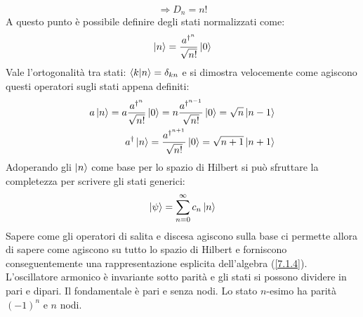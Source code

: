 \documentclass[twoside]{article}
\begin{document}
\begin{equation*}
    \Rightarrow D_n = n!
\end{equation*}
A questo punto è possibile definire degli stati normalizzati come:
\begin{equation}
    \ket{n}=\frac{a^{\dagger^n}}{\sqrt{n!}}\ket{0}
\end{equation}
Vale l'ortogonalità tra stati: $\bra{k}\ket{n}=\delta_{kn}$ e si dimostra velocemente come agiscono questi operatori sugli stati appena definiti:
\begin{equation} 
\begin{split}
    a\ket{n}=a\frac{a^{\dagger^n}}{\sqrt{n!}}\ket{0}=n\frac{a^{\dagger^{n-1}}}{\sqrt{n!}}\ket{0}=\sqrt{n}\ket{n-1} \\
    a^{\dagger}\ket{n}=\frac{a^{\dagger^{n+1}}}{\sqrt{n!}}\ket{0}=\sqrt{n+1}\ket{n+1}
\end{split}
\end{equation}
Adoperando gli $\ket{n}$ come base per lo spazio di Hilbert si può sfruttare la completezza per scrivere gli stati generici:
\begin{equation}
   \ket{\psi}=\displaystyle\sum_{n=0}^{\infty} c_n \ket{n} 
\end{equation}
Sapere come gli operatori di salita e discesa agiscono sulla base ci permette allora di sapere come agiscono su tutto lo spazio di Hilbert e forniscono conseguentemente una rappresentazione esplicita dell'algebra (\ref{7.1.4}). 
\\
L'oscillatore armonico è invariante sotto parità e gli stati si possono dividere in pari e dipari. Il fondamentale è pari e senza nodi. Lo stato $n$-esimo ha parità $(-1)^n$ e $n$ nodi.

\vspace{0.5cm}
\end{document}
